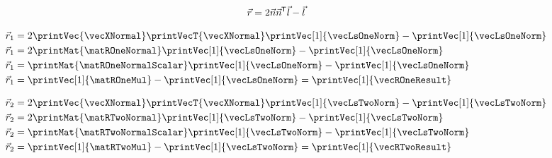 \documentclass[10pt, a4paper]{article}
\begin{document}
    \[\vec{r} = 2\vec{n}{\vec{n}}\mkern-1mu^{\mathsf{T}}\vec{l}-\vec{l}\]
    \begin{minipage}[t]{0.5\textwidth}
        \begin{align*}
            \vec{r}_1 &= 2 \printVec{\vecXNormal}
            \printVecT{\vecXNormal}
            \printVec[1]{\vecLsOneNorm} -
            \printVec[1]{\vecLsOneNorm}\\
            \vec{r}_1 &= 2 \printMat{\matROneNormal}
            \printVec[1]{\vecLsOneNorm} -
            \printVec[1]{\vecLsOneNorm}\\
            \vec{r}_1 &= \printMat{\matROneNormalScalar}
            \printVec[1]{\vecLsOneNorm} -
            \printVec[1]{\vecLsOneNorm}\\
            \vec{r}_1 &= \printVec[1]{\matROneMul} -
            \printVec[1]{\vecLsOneNorm} =
            \printVec[1]{\vecROneResult}
        \end{align*}
    \end{minipage}%
    \begin{minipage}[t]{0.5\textwidth}
        \begin{align*}
            \vec{r}_2 &= 2 \printVec{\vecXNormal}
            \printVecT{\vecXNormal}
            \printVec[1]{\vecLsTwoNorm} -
            \printVec[1]{\vecLsTwoNorm}\\
            \vec{r}_2 &= 2 \printMat{\matRTwoNormal}
            \printVec[1]{\vecLsTwoNorm} -
            \printVec[1]{\vecLsTwoNorm}\\
            \vec{r}_2 &= \printMat{\matRTwoNormalScalar}
            \printVec[1]{\vecLsTwoNorm} -
            \printVec[1]{\vecLsTwoNorm}\\
            \vec{r}_2 &= \printVec[1]{\matRTwoMul} -
            \printVec[1]{\vecLsTwoNorm} =
            \printVec[1]{\vecRTwoResult}
        \end{align*}
    \end{minipage}
\end{document}
